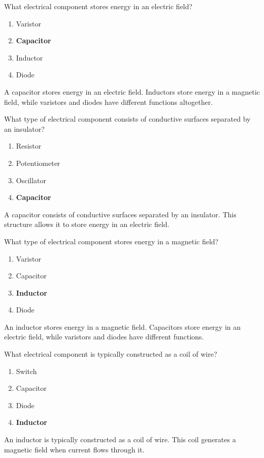 \begin{tcolorbox}[colback=gray!10!white,colframe=black!75!black,title={T6A04}]
    What electrical component stores energy in an electric field?
    \begin{enumerate}[label=\Alph*),noitemsep]
        \item Varistor
        \item \textbf{Capacitor}
        \item Inductor
        \item Diode
    \end{enumerate}
\end{tcolorbox}
A capacitor stores energy in an electric field. Inductors store energy in a magnetic field, while varistors and diodes have different functions altogether.

\begin{tcolorbox}[colback=gray!10!white,colframe=black!75!black,title={T6A05}]
    What type of electrical component consists of conductive surfaces separated by an insulator?
    \begin{enumerate}[label=\Alph*),noitemsep]
        \item Resistor
        \item Potentiometer
        \item Oscillator
        \item \textbf{Capacitor}
    \end{enumerate}
\end{tcolorbox}
A capacitor consists of conductive surfaces separated by an insulator. This structure allows it to store energy in an electric field.

\begin{tcolorbox}[colback=gray!10!white,colframe=black!75!black,title={T6A06}]
    What type of electrical component stores energy in a magnetic field?
    \begin{enumerate}[label=\Alph*),noitemsep]
        \item Varistor
        \item Capacitor
        \item \textbf{Inductor}
        \item Diode
    \end{enumerate}
\end{tcolorbox}
An inductor stores energy in a magnetic field. Capacitors store energy in an electric field, while varistors and diodes have different functions.

\begin{tcolorbox}[colback=gray!10!white,colframe=black!75!black,title={T6A07}]
    What electrical component is typically constructed as a coil of wire?
    \begin{enumerate}[label=\Alph*),noitemsep]
        \item Switch
        \item Capacitor
        \item Diode
        \item \textbf{Inductor}
    \end{enumerate}
\end{tcolorbox}
An inductor is typically constructed as a coil of wire. This coil generates a magnetic field when current flows through it.

